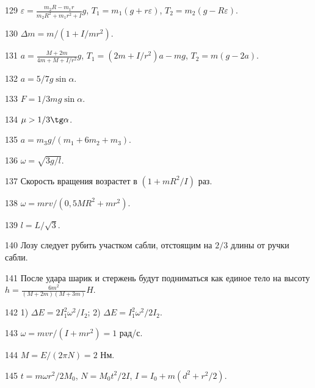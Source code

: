 \begin{Answer}{129}
$\varepsilon = \frac{m_2R - m_1r}{m_2R^2 + m_1r^2 + I}g$, $T_1 = m_1(g+r\varepsilon)$, $T_2 = m_2(g-R\varepsilon)$.
\end{Answer}
\begin{Answer}{130}
$\Delta m = m/(1+I/mr^2)$.
\end{Answer}
\begin{Answer}{131}
$a = \frac{M+2m}{4m+M+I/r^2}g$, $T_1 = (2m+I/r^2)a - mg$, $T_2=m(g-2a)$.
\end{Answer}
\begin{Answer}{132}
$a=5/7g\sin \alpha$.
\end{Answer}
\begin{Answer}{133}
$F = 1/3 mg \sin \alpha$.
\end{Answer}
\begin{Answer}{134}
$\mu > 1/3 \tg \alpha$.
\end{Answer}
\begin{Answer}{135}
$a = m_3g/(m_1 + 6m_2 +m_3)$.
\end{Answer}
\begin{Answer}{136}
$\omega = \sqrt{3g/l}$.
\end{Answer}
\begin{Answer}{137}
Скорость вращения возрастет в $(1+mR^2/I)$ раз.
\end{Answer}
\begin{Answer}{138}
$\omega = mrv/(0,5MR^2 + mr^2)$.
\end{Answer}
\begin{Answer}{139}
$l = L/\sqrt{3}$.
\end{Answer}
\begin{Answer}{140}
Лозу следует рубить участком сабли, отстоящим на $2/3$ длины от ручки сабли.
\end{Answer}
\begin{Answer}{141}
После удара шарик и стержень будут подниматься как единое тело на высоту $h = \frac{6m^2}{(M+2m)(M+3m)}H$.
\end{Answer}
\begin{Answer}{142}
1) $\Delta E = 2I_1^2\omega^2/I_2$; 2) $\Delta E = I_1^2\omega^2/2I_2$.
\end{Answer}
\begin{Answer}{143}
$\omega = mvr/(I+mr^2) = 1$ рад/с.
\end{Answer}
\begin{Answer}{144}
$M = E / (2 \pi N) = 2$ Нм.
\end{Answer}
\begin{Answer}{145}
$t = m\omega r^2 / 2M_0$, $N = M_0t^2/2I$, $I = I_0 + m(d^2 + r^2/2)$.
\end{Answer}
